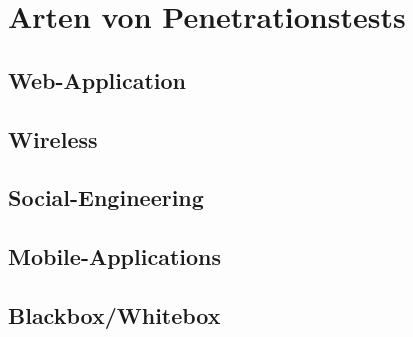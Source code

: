 \chapter{Arten von Penetrationstests}

	\section{Web-Application}
	\section{Wireless}
	\section{Social-Engineering}
	\section{Mobile-Applications}
	\section{Blackbox/Whitebox}